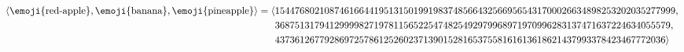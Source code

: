 \documentclass[t]{ctexbeamer}
\begin{document}
\begin{frame}
  \begin{preview}
    $\langle \text{\emoji{red-apple}}, \text{\emoji{banana}}, \text{\emoji{pineapple}} \rangle = \nolinebreak \langle \begin{aligned}[t] & 154476802108746166441951315019919837485664325669565431700026634898253202035277999, \\ & 36875131794129999827197811565225474825492979968971970996283137471637224634055579, \\ & 4373612677928697257861252602371390152816537558161613618621437993378423467772036 \rangle \end{aligned}$
  \end{preview}
\end{frame}
\end{document}
